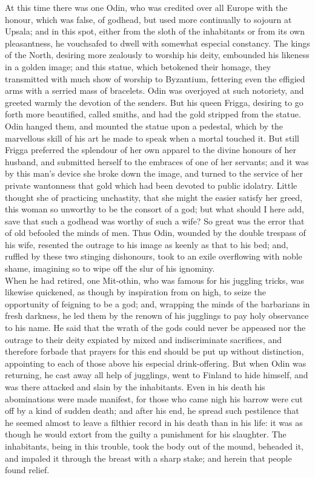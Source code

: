 \documentclass[10pt,a4paper]{report}
\begin{document}
At this time there was one Odin, who was credited over all Europe with the honour, which was false, of godhead, but used more continually to sojourn at Upsala; and in this spot, either from the sloth of the inhabitants or from its own pleasantness, he vouchsafed to dwell with somewhat especial constancy. The kings of the North, desiring more zealously to worship his deity, embounded his likeness in a golden image; and this statue, which betokened their homage, they transmitted with much show of worship to Byzantium, fettering even the effigied arms with a serried mass of bracelets. Odin was overjoyed at such notoriety, and greeted warmly the devotion of the senders. But his queen Frigga, desiring to go forth more beautified, called smiths, and had the gold stripped from the statue. Odin hanged them, and mounted the statue upon a pedestal, which by the marvellous skill of his art he made to speak when a mortal touched it. But still Frigga preferred the splendour of her own apparel to the divine honours of her husband, and submitted herself to the embraces of one of her servants; and it was by this man's device she broke down the image, and turned to the service of her private wantonness that gold which had been devoted to public idolatry. Little thought she of practicing unchastity, that she might the easier satisfy her greed, this woman so unworthy to be the consort of a god; but what should I here add, save that such a godhead was worthy of such a wife? So great was the error that of old befooled the minds of men. Thus Odin, wounded by the double trespass of his wife, resented the outrage to his image as keenly as that to his bed; and, ruffled by these two stinging dishonours, took to an exile overflowing with noble shame, imagining so to wipe off the slur of his ignominy.\\

When he had retired, one Mit-othin, who was famous for his juggling tricks, was likewise quickened, as though by inspiration from on high, to seize the opportunity of feigning to be a god; and, wrapping the minds of the barbarians in fresh darkness, he led them by the renown of his jugglings to pay holy observance to his name. He said that the wrath of the gods could never be appeased nor the outrage to their deity expiated by mixed and indiscriminate sacrifices, and therefore forbade that prayers for this end should be put up without distinction, appointing to each of those above his especial drink-offering. But when Odin was returning, he cast away all help of jugglings, went to Finland to hide himself, and was there attacked and slain by the inhabitants. Even in his death his abominations were made manifest, for those who came nigh his barrow were cut off by a kind of sudden death; and after his end, he spread such pestilence that he seemed almost to leave a filthier record in his death than in his life: it was as though he would extort from the guilty a punishment for his slaughter. The inhabitants, being in this trouble, took the body out of the mound, beheaded it, and impaled it through the breast with a sharp stake; and herein that people found relief.\\
\end{document}
